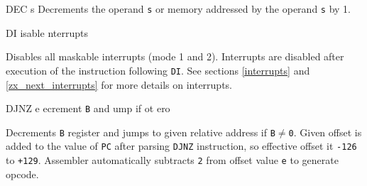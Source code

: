 \begin{basedescript}{
    \desclabelstyle{\multilinelabel}
    \desclabelwidth{3cm}}
\begin{DetailItem}{DEC s}
        Decrements the operand {\tt s} or memory addressed by the operand {\tt s} by 1.

        \begin{DetailEffects}[v]
            \FlagsDECr[8-bit]
        \end{DetailEffects}
		
        \begin{DetailTiming}
        \end{DetailTiming}

    \end{DetailItem}

    \pagebreak
    \begin{DetailItem}{DI}
        {isable nterrupts}
        {\SymDI}

        Disables all maskable interrupts (mode 1 and 2). Interrupts are disabled after execution of the instruction following {\tt DI}. See sections \ref{interrupts} and \ref{zx_next_interrupts} for more details on interrupts.
		
        \begin{DetailEffects}
            \FlagsDI
        \end{DetailEffects}
				
        \begin{DetailTiming}
        \end{DetailTiming}

    \end{DetailItem}

    \begin{DetailItem}{DJNZ e}
        {ecrement {\tt B} and ump if ot ero}
        {}

        Decrements {\tt B} register and jumps to given relative address if {\tt B$\neq$0}. Given offset is added to the value of {\tt PC} after parsing {\tt DJNZ} instruction, so effective offset it {\tt -126} to {\tt +129}. Assembler automatically subtracts {\tt 2} from offset value {\tt e} to generate opcode.


\end{DetailItem}
\end{basedescript}
